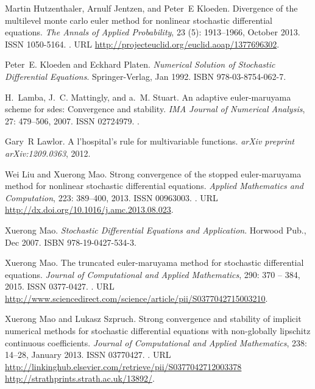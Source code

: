 \documentclass[sort&compress, preprint]{elsarticle}
\theoremstyle{definition}
\theoremstyle{plain}%
\theoremstyle{remark}
\begin{document}
\begin{thebibliography}{36}
Martin Hutzenthaler, Arnulf Jentzen, and Peter~E Kloeden.
\newblock Divergence of the multilevel monte carlo euler method for nonlinear
  stochastic differential equations.
\newblock \emph{The Annals of Applied Probability}, 23 (5):
  1913--1966, October 2013.
\newblock ISSN 1050-5164.
\newblock {}.
\newblock URL \url{http://projecteuclid.org/euclid.aoap/1377696302}.

Peter~E. Kloeden and Eckhard Platen.
\newblock \emph{Numerical Solution of Stochastic Differential Equations}.
\newblock Springer-Verlag, Jan 1992.
\newblock ISBN 978-03-8754-062-7.

H.~Lamba, J.~C. Mattingly, and a.~M. Stuart.
\newblock An adaptive euler-maruyama scheme for sdes: Convergence and
  stability.
\newblock \emph{IMA Journal of Numerical Analysis}, 27: 479--506,
  2007.
\newblock ISSN 02724979.
\newblock {}.

Gary~R Lawlor.
\newblock A l'hospital's rule for multivariable functions.
\newblock \emph{arXiv preprint arXiv:1209.0363}, 2012.

Wei Liu and Xuerong Mao.
\newblock Strong convergence of the stopped euler-maruyama method for nonlinear
  stochastic differential equations.
\newblock \emph{Applied Mathematics and Computation}, 223: 389--400,
  2013.
\newblock ISSN 00963003.
\newblock {}.
\newblock URL \url{http://dx.doi.org/10.1016/j.amc.2013.08.023}.

Xuerong Mao.
\newblock \emph{Stochastic Differential Equations and Application}.
\newblock Horwood Pub., Dec 2007.
\newblock ISBN 978-19-0427-534-3.

Xuerong Mao.
\newblock The truncated euler-maruyama method for stochastic differential
  equations.
\newblock \emph{Journal of Computational and Applied Mathematics},
  290: 370 -- 384, 2015.
\newblock ISSN 0377-0427.
\newblock {}.
\newblock URL
  \url{http://www.sciencedirect.com/science/article/pii/S0377042715003210}.

Xuerong Mao and Lukasz Szpruch.
\newblock Strong convergence and stability of implicit numerical methods for
  stochastic differential equations with non-globally lipschitz continuous
  coefficients.
\newblock \emph{Journal of Computational and Applied Mathematics},
  238: 14--28, January 2013.
\newblock ISSN 03770427.
\newblock {}.
\newblock URL
  \url{http://linkinghub.elsevier.com/retrieve/pii/S0377042712003378
  http://strathprints.strath.ac.uk/13892/}.


\end{thebibliography}
\end{document}
